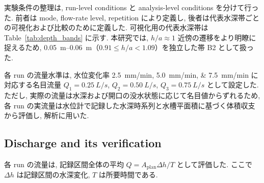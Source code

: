 実験条件の整理は, run-level conditions と analysis-level conditions を分けて行った. 前者は mode, flow-rate level, repetition により定義し, 後者は代表水深帯ごとの可視化および比較のために定義した. 可視化用の代表水深帯は Table~\ref{tab:depth_bands} に示す. 本研究では, $h/a \approx 1$ 近傍の遷移をより明瞭に捉えるため, \SIrange{0.05}{0.06}{m}（$0.91 \le h/a < 1.09$）を独立した帯 B2 として扱った.

各 run の流量水準は, 水位変化率 \SIlist{2.5;5.0;7.5}{mm/min} に対応する名目流量
$Q_1=\SI{0.25}{L/s}$, $Q_2=\SI{0.50}{L/s}$, $Q_3=\SI{0.75}{L/s}$ として設定した.
ただし, 実際の流量は水深および開口の没水状態に応じて名目値からずれるため, 各 run の実流量は水位計で記録した水深時系列と水槽平面積に基づく体積収支から評価し, 解析に用いた.

\subsection{Discharge and its verification}
\label{sec:methods_discharge}

各 run の流量は, 記録区間全体の平均 $Q = A_{\mathrm{plan}} \Delta h / T$ として評価した. ここで $\Delta h$ は記録区間の水深変化, $T$ は所要時間である.

